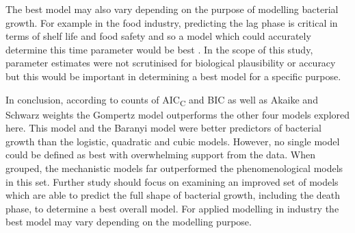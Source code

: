 \documentclass[11pt]{article}
\begin{document}
\begin{linenumbers}
        The best model may also vary depending on the purpose of modelling bacterial growth. For example in the food industry, predicting the lag phase is critical in terms of shelf life and food safety and so a model which could accurately determine this time parameter would be best \citep{ross_modeling_2003, mahdinia_microbial_2020}. In the scope of this study, parameter estimates were not scrutinised for biological plausibility or accuracy but this would be important in determining a best model for a specific purpose. 
        
        In conclusion, according to counts of AIC\textsubscript{C} and BIC as well as Akaike and Schwarz weights the Gompertz model outperforms the other four models explored here. This model and the Baranyi model were better predictors of bacterial growth than the logistic, quadratic and cubic models. However, no single model could be defined as best with overwhelming support from the data. When grouped, the mechanistic models far outperformed the phenomenological models in this set. Further study should focus on examining an improved set of models which are able to predict the full shape of bacterial growth, including the death phase, to determine a best overall model. For applied modelling in industry the best model may vary depending on the modelling purpose.

    
    
    
    
    
    \end{linenumbers}
\end{document}
